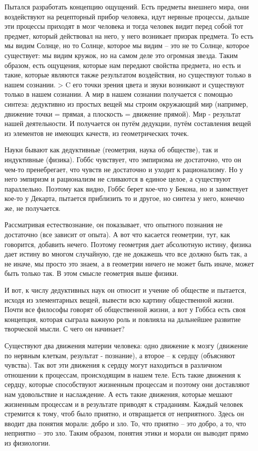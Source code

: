 Пытался разработать концепцию ощущений. Есть предметы внешнего мира, они воздействуют на рецепторный прибор человека, идут нервные процессы, дальше эти процессы приходят в мозг человека и тогда человек видит перед собой тот предмет, который действовал на него, у него возникает призрак предмета. То есть мы видим Солнце, но то Солнце, которое мы видим – это не то Солнце, которое существует: мы видим кружок, но на самом деле это огромная звезда. Таким образом, есть ощущения, которые нам передают свойства предмета, но есть и такие, которые являются также результатом воздействия, но существуют только в нашем сознании. > C его точки зрения цвета и звуки возникают и существуют только в нашем сознании. А мир в нашем сознании получается с помощью синтеза: дедуктивно из простых вещей мы строим окружающий мир (например, движение точки = прямая, а плоскость = движение прямой). Мир - результат нашей деятельности. И получается он путём дедукции, путём составления вещей из элементов не имеющих качеств, из геометрических точек.

Науки бывают как дедуктивные (геометрия, наука об обществе), так и индуктивные (физика). Гоббс чувствует, что эмпиризма не достаточно, что он чем-то пренебрегает, что чувств не достаточно и уходит к рационализму. Но у него эмпиризм и рационализм не сливаются в единое целое, а существуют параллельно. Поэтому как видно, Гоббс берет кое-что у Бекона, но и заимствует кое-то у Декарта, пытается приблизить то и другое, но синтеза у него, конечно же, не получается.

Рассматривая естествознание, он показывает, что опытного познания не достаточно (все зависит от опыта). А вот что касается геометрии, тут, как говорится, добавить нечего. Поэтому геометрия дает абсолютную истину, физика дает истину во многом случайную, где не докажешь что все должно быть так, а не иначе, мы просто это знаем, а в геометрии ничего не может быть иначе, может быть только так. В этом смысле геометрия выше физики.

И вот, к числу дедуктивных наук он относит и учение об обществе и пытается, исходя из элементарных вещей, вывести всю картину общественной жизни. Почти все философы говорят об общественной жизни, а вот у Гоббса есть своя концепция, которая сыграла важную роль и повлияла на дальнейшее развитие творческой мысли. С чего он начинает?

    Существуют два движения материи человека: одно движение к мозгу (движение по нервным клеткам, результат - познание), а второе – к сердцу (объясняют чувства). Так вот эти движения к сердцу могут находиться в различном отношении к процессам, происходящим в нашем теле. Есть такие движения к сердцу, которые способствуют жизненным процессам и поэтому они доставляют нам удовольствие и наслаждение. А есть такие движения, которые мешают жизненным процессам и в результате приводят к страданиям. Каждый человек стремится к тому, чтоб было приятно, и отвращается от неприятного. Здесь он вводит два понятия морали: добро и зло. То, что приятно – это добро, а то, что неприятно – это зло. Таким образом, понятия этики и морали он выводит прямо из физиологии.

